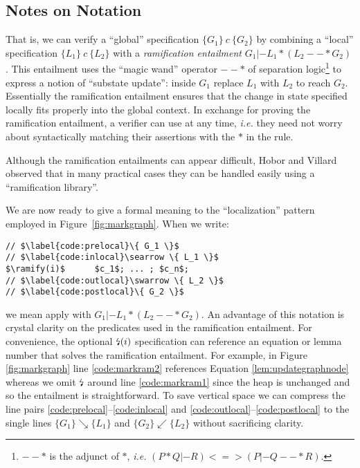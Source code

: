 \subsection{Notes on Notation}

That is, we can verify a ``global'' specification $\{G_1\}~c~\{G_2\}$ by combining a ``local'' specification $\{L_1\}~c~\{L_2\}$ with a \emph{ramification entailment} $G_1 |- L_1 * (L_2--* G_2)$.  This entailment uses the ``magic wand'' operator $--*$ of separation logic\footnote{$--*$ is the adjunct of $*$, \emph{i.e.} $(P * Q |- R) <=> (P |- Q --* R)$.} to express a notion of ``substate update'': inside $G_1$ replace $L_1$ with $L_2$ to reach $G_2$.  Essentially the ramification entailment ensures that the change in state specified locally fits properly into the global context.  In exchange for proving the ramification entailment, a verifier can use  at any time, \emph{i.e.} they need not worry about syntactically matching their assertions with the $*$ in the  rule.

Although the ramification entailments can appear difficult, Hobor and Villard observed that in many practical cases they can be handled easily using a ``ramification library''.


We are now ready to give a formal meaning to the ``localization'' pattern employed in Figure~\ref{fig:markgraph}.  When we write:
\vspace{-4ex}
\begin{lstlisting}
// $\label{code:prelocal}\{ G_1 \}$
// $\label{code:inlocal}\searrow \{ L_1 \}$
$\ramify(i)$      $c_1$; ... ; $c_n$;
// $\label{code:outlocal}\swarrow \{ L_2 \}$
// $\label{code:postlocal}\{ G_2 \}$
\end{lstlisting}
\vspace{-1.5ex}
we mean apply  with $G_1 |- L_1 * (L_2 --* G_2)$.
An advantage of this notation is crystal clarity on the predicates used in the ramification entailment.  For convenience, the optional $\mbox{\lightning}(i)$ specification can reference an equation or lemma number that solves the ramification entailment.  For example, in Figure \ref{fig:markgraph} line \ref{code:markram2} references Equation \eqref{lem:updategraphnode} whereas we omit $\mbox{\lightning}$ around line \ref{code:markram1} since the heap is unchanged and so the entailment is straightforward. To save vertical space we can compress the line pairs \ref{code:prelocal}--\ref{code:inlocal} and \ref{code:outlocal}--\ref{code:postlocal}
to the single lines $\{ G_1 \} \searrow \{ L_1 \}$ and $\{ G_2 \} \swarrow \{ L_2 \}$ without sacrificing clarity.

